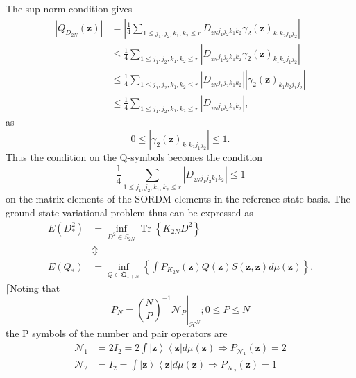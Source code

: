 \documentclass[aps,preprint]{revtex4}%
\begin{document}
The sup norm condition gives
\begin{align}
\left\vert Q_{D_{2N}}\left(  \mathbf{z}\right)  \right\vert  &  =\left\vert
\frac{1}{4}\sum_{1\leq j_{1},j_{2},k_{1},k_{2}\leq r}D_{_{2N}j_{1}j_{2}%
k_{1}k_{2}}\gamma_{2}\left(  \mathbf{z}\right)  _{k_{1}k_{2}j_{1}j_{2}%
}\right\vert \nonumber\\
&  \leq\frac{1}{4}\sum_{1\leq j_{1},j_{2},k_{1},k_{2}\leq r}\left\vert
D_{_{2N}j_{1}j_{2}k_{1}k_{2}}\gamma_{2}\left(  \mathbf{z}\right)  _{k_{1}%
k_{2}j_{1}j_{2}}\right\vert \nonumber\\
&  \leq\frac{1}{4}\sum_{1\leq j_{1},j_{2},k_{1},k_{2}\leq r}\left\vert
D_{_{2N}j_{1}j_{2}k_{1}k_{2}}\right\vert \left\vert \gamma_{2}\left(
\mathbf{z}\right)  _{k_{1}k_{2}j_{1}j_{2}}\right\vert \nonumber\\
&  \leq\frac{1}{4}\sum_{1\leq j_{1},j_{2},k_{1},k_{2}\leq r}\left\vert
D_{_{2N}j_{1}j_{2}k_{1}k_{2}}\right\vert ,
\end{align}
as
\begin{equation}
0\leq\left\vert \gamma_{2}\left(  \mathbf{z}\right)  _{k_{1}k_{2}j_{1}j_{2}%
}\right\vert \leq1.
\end{equation}
Thus the condition on the Q-symbols becomes the condition
\begin{equation}
\frac{1}{4}\sum_{1\leq j_{1},j_{2},k_{1},k_{2}\leq r}\left\vert D_{_{2N}%
j_{1}j_{2}k_{1}k_{2}}\right\vert \leq1
\end{equation}
on the matrix elements of the SORDM elements in the reference state basis. The
ground state variational problem thus can be expressed as
\begin{align}
E\left(  D_{\ast}^{2}\right)   &  =\inf_{D^{2}\in S_{2N}}\operatorname*{Tr}%
\left\{  K_{2N}D^{2}\right\} \nonumber\\
&  \Updownarrow\nonumber\\
E\left(  Q_{\ast}\right)   &  =\inf_{Q\in\mathfrak{Q}_{1+N}}\left\{  \int
P_{K_{2N}}\left(  \mathbf{z}\right)  Q\left(  \mathbf{z}\right)  S\left(
\mathbf{\bar{z},z}\right)  d\mu\left(  \mathbf{z}\right)  \right\}  .
\end{align}
$\lceil$Noting that
\begin{equation}
P_{N}=\left.  \binom{N}{P}^{-1}\mathcal{N}_{P}\right\vert _{\mathcal{H}^{N}%
};0\leq P\leq N
\end{equation}
the P symbols of the number and pair operators are
\begin{align}
\mathcal{N}_{1}  &  =2I_{2}=2\int\left\vert \mathbf{z}\right\rangle
\left\langle \mathbf{z}\right\vert d\mu\left(  \mathbf{z}\right)  \Rightarrow
P_{\mathcal{N}_{1}}\left(  \mathbf{z}\right)  =2\nonumber\\
\mathcal{N}_{2}  &  =I_{2}=\int\left\vert \mathbf{z}\right\rangle \left\langle
\mathbf{z}\right\vert d\mu\left(  \mathbf{z}\right)  \Rightarrow
P_{\mathcal{N}_{2}}\left(  \mathbf{z}\right)  =1
\end{align}
\end{document}
